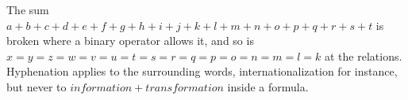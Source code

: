 \hsize=150pt \mathsurround=1pt
The sum $a+b+c+d+e+f+g+h+i+j+k+l+m+n+o+p+q+r+s+t$ is broken where a binary
operator allows it, and so is $x=y=z=w=v=u=t=s=r=q=p=o=n=m=l=k$ at the
relations. Hyphenation applies to the surrounding words, internationalization
for instance, but never to $information+transformation$ inside a formula.
\bye
